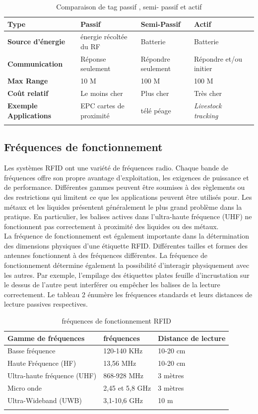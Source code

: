 \documentclass[11pt, a4paper, twoside]{book}
\begin{document}
\begin{longtable}{|p{}|p{}|p{}| p{}| p{}|}
\hline
\textbf{Type} & \textbf{Passif} & \textbf{Semi-Passif} & \textbf{Actif} \\
\hline
\textbf{Source d'énergie} & énergie récoltée du RF & Batterie & Batterie \\
\hline
\textbf{Communication} & Réponse seulement & Répondre seulement & Répondre et/ou initier \\
\hline
\textbf{Max Range} & 10 M & 100 M &  100 M \\
\hline
\textbf{Coût relatif} & Le moins cher & Plus cher & Très cher \\
\hline
\textbf{Exemple Applications} & EPC cartes de proximité & télé péage &  \emph {Livestock tracking} \\
\hline
\caption{Comparaison de tag passif , semi- passif et actif}
\end{longtable}


\subsection{Fréquences de fonctionnement}
Les systèmes RFID ont une variété de fréquences radio. Chaque bande de fréquences offre son propre avantage d'exploitation, les exigences de puissance et de performance. Différentes gammes peuvent être soumises à des règlements ou des restrictions qui limitent ce que les applications peuvent être utilisés pour.
Les métaux et les liquides présentent généralement le plus grand problème dans la pratique. En particulier, les balises actives dans l'ultra-haute fréquence (UHF) ne fonctionnent pas correctement à proximité des liquides ou des métaux.\\


La fréquence de fonctionnement est également importante dans la détermination des dimensions physiques d'une étiquette RFID. Différentes tailles et formes des antennes fonctionnent à des fréquences différentes. La fréquence de fonctionnement détermine également la possibilité d'interagir physiquement avec les autres. Par exemple, l'empilage des étiquettes plates feuille d'incrustation sur le dessus de l'autre peut interférer ou empêcher les balises de la lecture correctement. Le tableau 2 énumère les fréquences standards et leurs distances de lecture passives respectives.\\
\begin{longtable}{|p{}|p{}|p{}|}
\hline
\textbf{Gamme de fréquences} & \textbf{fréquences} & \textbf{Distance de lecture} \\
\hline
Basse fréquence & 120-140 KHz & 10-20 cm  \\
\hline
Haute Fréquence (HF) & 13,56 MHz & 10-20 cm \\
\hline
Ultra-haute fréquence (UHF) & 868-928 MHz & 3 mètres \\
\hline
Micro onde & 2,45 et 5,8 GHz & 3 mètres \\
\hline
Ultra-Wideband (UWB) & 3,1-10,6 GHz & 10 m \\
\hline
\caption{fréquences de fonctionnement RFID}
\end{longtable}
\end{document}
